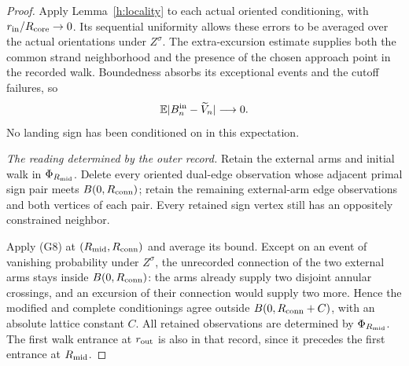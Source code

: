 \begin{proof}
Apply Lemma~\ref{h:locality} to each actual oriented conditioning,
with $r_{\rm in}/R_{\rm core}\to0$. Its sequential uniformity allows
these errors to be averaged over the actual orientations under
$Z^\sigma$. The extra-excursion estimate supplies both the common
strand neighborhood and the presence of the chosen approach point in
the recorded walk. Boundedness absorbs its exceptional events and the
cutoff failures, so
\[
 \mathbb E|B_n^{\rm in}-\widetilde V_n|\longrightarrow0.
\]
No landing sign has been conditioned on in this expectation.

\emph{The reading determined by the outer record.}
Retain the external arms and initial walk in $\Phi_{R_{\rm mid}}$.
Delete every oriented dual-edge observation whose adjacent primal
sign pair meets $B(0,R_{\rm conn})$; retain the remaining external-arm
edge observations and both vertices of each pair. Every retained sign
vertex still has an oppositely constrained neighbor.

Apply (G8) at $(R_{\rm mid},R_{\rm conn})$ and average its bound.
Except on an event of vanishing probability under $Z^\sigma$, the
unrecorded connection of the two external arms stays inside
$B(0,R_{\rm conn})$: the arms already supply two disjoint annular
crossings, and an excursion of their connection would supply two more.
Hence the modified and complete conditionings agree outside
$B(0,R_{\rm conn}+C)$, with an absolute lattice constant $C$.
All retained observations are determined by $\Phi_{R_{\rm mid}}$.
The first walk entrance at $r_{\rm out}$ is also in that record,
since it precedes the first entrance at $R_{\rm mid}$.


\end{proof}
